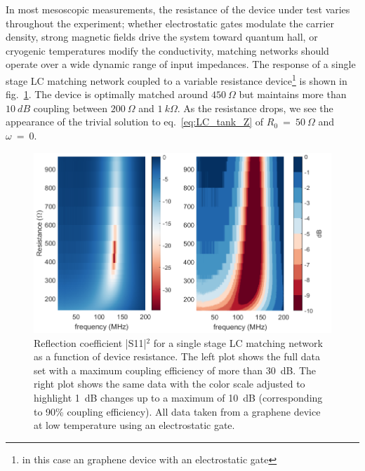 In most mesoscopic measurements, the resistance of the device under test varies throughout the experiment; whether electrostatic gates modulate the carrier density, strong magnetic fields drive the system toward quantum hall, or cryogenic temperatures modify the conductivity, matching networks should operate over a wide dynamic range of input impedances. The response of a single stage LC matching network coupled to a variable resistance device\footnote{in this case an graphene device with an electrostatic gate} is shown in fig.~\ref{fig:S11vsR}. The device is optimally matched around $450~\Omega$ but maintains more than $10~dB$ coupling between $200~\Omega$ and $1~k\Omega$. As the resistance drops, we see the appearance of the trivial solution to eq.~\ref{eq:LC_tank_Z} of $R_0~=~50~\Omega$ and $\omega~=~0$. 
\begin{figure}
\centering
\includegraphics[width=120mm]{figures/Johnson_noise_thermometry/S11vsR.png}
\caption{Reflection coefficient |S11|$^2$ for a single stage LC matching network as a function of device resistance. The left plot shows the full data set with a maximum coupling efficiency of more than 30~dB. The right plot shows the same data with the color scale adjusted to highlight 1~dB changes up to a maximum of 10~dB (corresponding to 90\% coupling efficiency). All data taken from a graphene device at low temperature using an electrostatic gate.}
\label{fig:S11vsR}
\end{figure}

